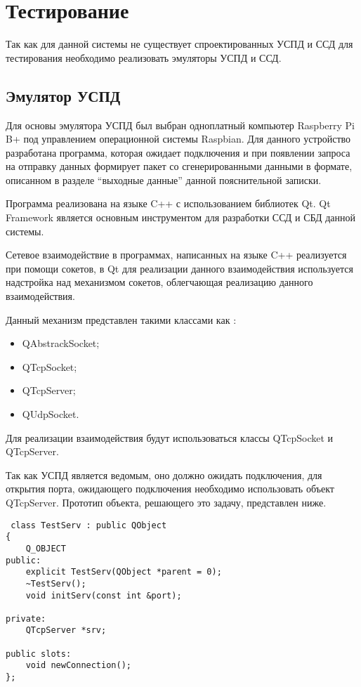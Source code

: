 \newpage
\section{Тестирование}
\setcounter{figure}{0}

Так как для данной системы не существует спроектированных УСПД и ССД для тестирования необходимо реализовать эмуляторы УСПД и ССД. 

\subsection{Эмулятор УСПД}

Для основы эмулятора УСПД был выбран одноплатный компьютер Raspberry Pi B+ под управлением операционной системы Raspbian. Для данного устройство разработана программа, которая ожидает подключения и при появлении запроса на отправку данных формирует пакет со сгенерированными данными в формате, описанном в разделе ``выходные данные'' данной пояснительной записки.

Программа реализована на языке C++ с использованием библиотек Qt. Qt Framework является основным инструментом для разработки ССД и СБД данной системы.

Сетевое взаимодействие в программах, написанных на языке C++ реализуется при помощи сокетов\cite{cpp}, в Qt для реализации данного взаимодействия используется надстройка над механизмом сокетов, облегчающая реализацию данного взаимодействия.

Данный механизм представлен такими классами как \cite{qt}:
\begin{itemize}
 \item QAbstrackSocket;
 \item QTcpSocket;
 \item QTcpServer;
 \item QUdpSocket.
\end{itemize}

Для реализации взаимодействия будут использоваться классы QTcpSocket и QTcpServer.

Так как УСПД является ведомым, оно должно ожидать подключения, для открытия порта, ожидающего подключения необходимо использовать объект QTcpServer. Прототип объекта, решающего это задачу, представлен ниже.

\begin{lstlisting}
 class TestServ : public QObject
{
    Q_OBJECT
public:
    explicit TestServ(QObject *parent = 0);
    ~TestServ();
    void initServ(const int &port);

private:
    QTcpServer *srv;

public slots:
    void newConnection();
};
\end{lstlisting}

